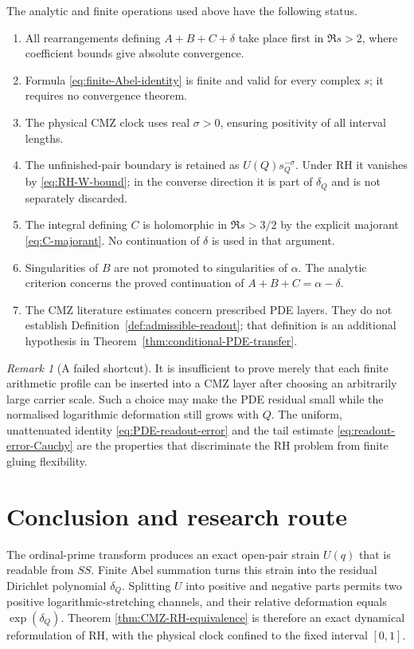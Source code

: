 \documentclass[11pt]{amsart}
\numberwithin{equation}{section}
\theoremstyle{plain}
\theoremstyle{definition}
\theoremstyle{remark}
\newtheorem{remark}[theorem]{Remark}
\begin{document}
The analytic and finite operations used above have the following status.
\begin{enumerate}[label=\textup{A\arabic*.},leftmargin=*]
\item All rearrangements defining $A+B+C+\delta$ take place first in
$\Re s>2$, where coefficient bounds give absolute convergence.
\item Formula \eqref{eq:finite-Abel-identity} is finite and valid for every
complex $s$; it requires no convergence theorem.
\item The physical CMZ clock uses real $\sigma>0$, ensuring positivity of all
interval lengths.
\item The unfinished-pair boundary is retained as $U(Q)s_Q^{-\sigma}$.
Under RH it vanishes by \eqref{eq:RH-W-bound}; in the converse direction it is
part of $\delta_Q$ and is not separately discarded.
\item The integral defining $C$ is holomorphic in $\Re s>3/2$ by the explicit
majorant \eqref{eq:C-majorant}.  No continuation of $\delta$ is used in that
argument.
\item Singularities of $B$ are not promoted to singularities of $\alpha$.
The analytic criterion concerns the proved continuation of
$A+B+C=\alpha-\delta$.
\item The CMZ literature estimates concern prescribed PDE layers.  They do not
establish Definition~\ref{def:admissible-readout}; that definition is an
additional hypothesis in Theorem~\ref{thm:conditional-PDE-transfer}.
\end{enumerate}

\begin{remark}[A failed shortcut]
\label{rem:failed-shortcut}
It is insufficient to prove merely that each finite arithmetic profile can be
inserted into a CMZ layer after choosing an arbitrarily large carrier scale.
Such a choice may make the PDE residual small while the normalised logarithmic
deformation still grows with $Q$.  The uniform, unattenuated identity
\eqref{eq:PDE-readout-error} and the tail estimate
\eqref{eq:readout-error-Cauchy} are the properties that discriminate the RH
problem from finite gluing flexibility.
\end{remark}

\section{Conclusion and research route}
\label{sec:conclusion}

The ordinal-prime transform produces an exact open-pair strain $U(q)$ that is
readable from $SS$.  Finite Abel summation turns this strain into the residual
Dirichlet polynomial $\delta_Q$.  Splitting $U$ into positive and negative
parts permits two positive logarithmic-stretching channels, and their relative
deformation equals $\exp(\delta_Q)$.  Theorem
\ref{thm:CMZ-RH-equivalence} is therefore an exact dynamical reformulation of
RH, with the physical clock confined to the fixed interval $[0,1]$.
\end{document}
